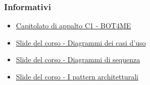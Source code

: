 \subsubsection{Informativi}
\begin{itemize}
    \item \href{https://www.math.unipd.it/~tullio/IS-1/2021/Progetto/C1.pdf}{\color{blue} Capitolato di appalto C1 - BOT4ME}
    \item \href{https://www.math.unipd.it/~rcardin/swea/2022/Diagrammi%20Use%20Case.pdf}{\color{blue} Slide del corso - Diagrammi dei casi d'uso}
    \item \href{https://www.math.unipd.it/~rcardin/swea/2022/Diagrammi%20di%20Sequenza.pdf}{\color{blue} Slide del corso - Diagrammi di sequenza}
    \item \href{https://www.math.unipd.it/~rcardin/swea/2022/Software%20Architecture%20Patterns.pdf}{\color{blue} Slide del corso - I pattern architetturali}
\end{itemize}
\newpage